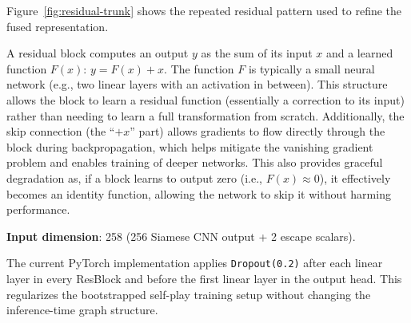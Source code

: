 \documentclass[11pt,a4paper]{article}
\begin{document}
Figure~\ref{fig:residual-trunk} shows the repeated residual pattern used to refine the fused representation.

A residual block computes an output $y$ as the sum of its input $x$ and a learned function $F(x)$: $y = F(x) + x$.
The function $F$ is typically a small neural network (e.g., two linear layers with an activation in between).
This structure allows the block to learn a residual function (essentially a correction to its input) rather than needing to learn a full transformation from scratch.
Additionally, the skip connection (the ``$+x$'' part) allows gradients to flow directly through the block during backpropagation, which helps mitigate the vanishing gradient problem and enables training of deeper networks.
This also provides graceful degradation as, if a block learns to output zero (i.e., $F(x) \approx 0$), it effectively becomes an identity function, allowing the network to skip it without harming performance.

\textbf{Input dimension}: 258 (256 Siamese CNN output + 2 escape scalars).

The current PyTorch implementation applies \texttt{Dropout(0.2)} after each linear layer in every ResBlock and before the first linear layer in the output head. This regularizes the bootstrapped self-play training setup without changing the inference-time graph structure.
\end{document}
